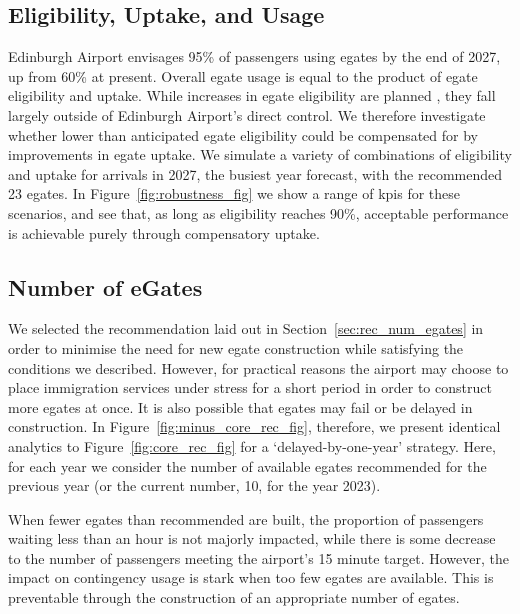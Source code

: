 \documentclass[10pt]{article}
\begin{document}
\subsection{Eligibility, Uptake, and Usage}
Edinburgh Airport envisages 95\% of passengers using \glspl{egate} by the end of 2027, up from 60\% at present. Overall \gls{egate} usage is equal to the product of \gls{egate} eligibility and uptake. While increases in \gls{egate} eligibility are planned \cite{UK_border_2025}, they fall largely outside of Edinburgh Airport's direct control. We therefore investigate whether lower than anticipated \gls{egate} eligibility could be compensated for by improvements in \gls{egate} uptake. We simulate a variety of combinations of eligibility and uptake for arrivals in 2027, the busiest year forecast, with the recommended 23 \glspl{egate}. In Figure~\ref{fig:robustness_fig} we show a range of \glspl{kpi} for these scenarios, and see that, as long as eligibility reaches 90\%, acceptable performance is achievable purely through compensatory uptake.






\subsection{Number of eGates}
We selected the recommendation laid out in Section~\ref{sec:rec_num_egates} in order to minimise the need for new \gls{egate} construction while satisfying the conditions we described. However, for practical reasons the airport may choose to place immigration services under stress for a short period in order to construct more \glspl{egate} at once. It is also possible that \glspl{egate} may fail or be delayed in construction. In Figure~\ref{fig:minus_core_rec_fig}, therefore, we present identical analytics to Figure~\ref{fig:core_rec_fig} for a `delayed-by-one-year' strategy. Here, for each year we consider the number of available \glspl{egate} recommended for the previous year (or the current number, 10, for the year 2023).



 When fewer \glspl{egate} than recommended are built, the proportion of passengers waiting less than an hour is not majorly impacted, while there is some decrease to the number of passengers meeting the airport's 15 minute target.  However, the impact on contingency usage is stark when too few \glspl{egate} are available. This is preventable through the construction of an appropriate number of \glspl{egate}.
\end{document}

